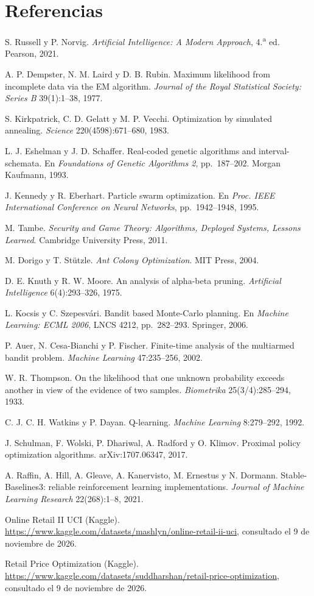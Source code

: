 \section*{Referencias}
{\raggedright
\begin{enumerate}[label={[\arabic*]},leftmargin=*,itemsep=1pt]
\item S. Russell y P. Norvig. \emph{Artificial Intelligence: A Modern Approach}, 4.\textsuperscript{a} ed. Pearson, 2021.
\item A. P. Dempster, N. M. Laird y D. B. Rubin. Maximum likelihood from incomplete data via the EM algorithm. \emph{Journal of the Royal Statistical Society: Series B} 39(1):1--38, 1977.
\item S. Kirkpatrick, C. D. Gelatt y M. P. Vecchi. Optimization by simulated annealing. \emph{Science} 220(4598):671--680, 1983.
\item L. J. Eshelman y J. D. Schaffer. Real-coded genetic algorithms and interval-schemata. En \emph{Foundations of Genetic Algorithms 2}, pp.~187--202. Morgan Kaufmann, 1993.
\item J. Kennedy y R. Eberhart. Particle swarm optimization. En \emph{Proc. IEEE International Conference on Neural Networks}, pp.~1942--1948, 1995.
\item M. Tambe. \emph{Security and Game Theory: Algorithms, Deployed Systems, Lessons Learned}. Cambridge University Press, 2011.
\item M. Dorigo y T. Stützle. \emph{Ant Colony Optimization}. MIT Press, 2004.
\item D. E. Knuth y R. W. Moore. An analysis of alpha-beta pruning. \emph{Artificial Intelligence} 6(4):293--326, 1975.
\item L. Kocsis y C. Szepesvári. Bandit based Monte-Carlo planning. En \emph{Machine Learning: ECML 2006}, LNCS 4212, pp.~282--293. Springer, 2006.
\item P. Auer, N. Cesa-Bianchi y P. Fischer. Finite-time analysis of the multiarmed bandit problem. \emph{Machine Learning} 47:235--256, 2002.
\item W. R. Thompson. On the likelihood that one unknown probability exceeds another in view of the evidence of two samples. \emph{Biometrika} 25(3/4):285--294, 1933.
\item C. J. C. H. Watkins y P. Dayan. Q-learning. \emph{Machine Learning} 8:279--292, 1992.
\item J. Schulman, F. Wolski, P. Dhariwal, A. Radford y O. Klimov. Proximal policy optimization algorithms. arXiv:1707.06347, 2017.
\item A. Raffin, A. Hill, A. Gleave, A. Kanervisto, M. Ernestus y N. Dormann. Stable-Baselines3: reliable reinforcement learning implementations. \emph{Journal of Machine Learning Research} 22(268):1--8, 2021.
\item Online Retail II UCI (Kaggle). \url{https://www.kaggle.com/datasets/mashlyn/online-retail-ii-uci}, consultado el 9 de noviembre de 2026.
\item Retail Price Optimization (Kaggle). \url{https://www.kaggle.com/datasets/suddharshan/retail-price-optimization}, consultado el 9 de noviembre de 2026.
\end{enumerate}
\par}

\clearpage
\endgroup

